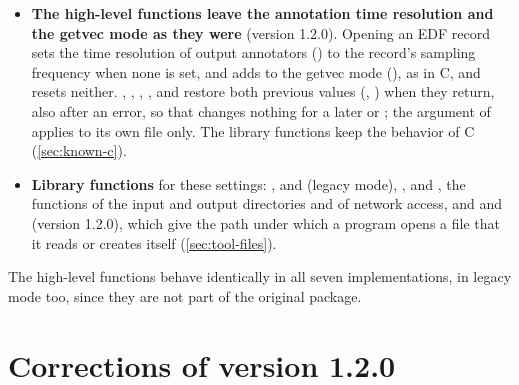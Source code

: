 \begin{itemize}
  in it,  returns them, and  writes
  them (\cref{chap:metadata}). The info strings are those that
   reads, after the record line found as the header parser
  finds it, in every mode (\cref{sec:record-line-divergence}). The library
  functions  and , and the tools, are unchanged,
  and the C library reads the changed headers as before.
\item \textbf{The high-level functions leave the annotation time resolution
  and the getvec mode as they were} (version 1.2.0). Opening an EDF record
  sets the time resolution of output annotators () to the
  record's sampling frequency when none is set, and adds
   to the getvec mode (), as in C, and
   resets neither. , ,
  , , 
  and  restore both previous values (,
  ) when they return, also after an error, so that
   changes nothing for a later
   or ; the  argument of
   applies to its own file only. The library
  functions keep the behavior of C (\cref{sec:known-c}).
\item \textbf{Library functions} for these settings: ,
   and  (legacy mode),
  ,  and
  , the functions of the input and output
  directories and of network access, and  and
   (version 1.2.0), which give the path under
  which a program opens a file that it reads or creates itself
  (\cref{sec:tool-files}).
\end{itemize}
The high-level functions behave identically in all seven implementations,
in legacy mode too, since they are not part of the original package.

\section{Corrections of version 1.2.0}
\label{sec:corrections-1-2-0}

